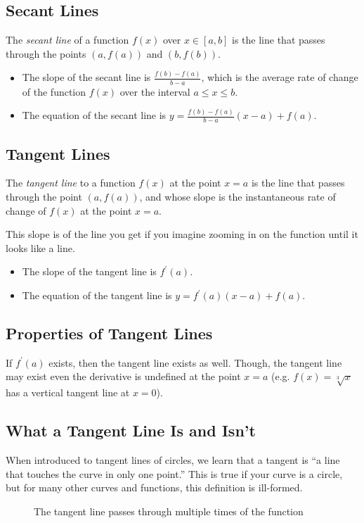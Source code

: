 \subsection{Secant Lines}
The \textit{secant line} of a function $f(x)$ over $x\in\left[a,b\right]$ is the line that passes through the points $(a,f(a))$ and $(b,f(b))$.
\begin{itemize}
  \item The slope of the secant line is $\frac{f(b)-f(a)}{b-a}$, which is the average rate of change of the function $f(x)$ over the interval $a\leq x\leq b$.
  \item The equation of the secant line is $y=\frac{f(b)-f(a)}{b-a}(x-a)+f(a)$.
\end{itemize}

\subsection{Tangent Lines}
The \textit{tangent line} to a function $f(x)$ at the point $x=a$ is the line that passes through the point $(a,f(a))$, and whose slope is the instantaneous rate of change of $f(x)$ at the point $x=a$.
\begin{remark}
This slope is of the line you get if you imagine zooming in on the function until it looks like a line.
\end{remark}
\begin{itemize}
  \item The slope of the tangent line is $f^\prime(a)$.
  \item The equation of the tangent line is $y=f^\prime(a)(x-a)+f(a)$.
\end{itemize}

\subsection{Properties of Tangent Lines}
If $f^\prime(a)$ exists, then the tangent line exists as well. Though, the tangent line may exist even the derivative is undefined at the point $x=a$ (e.g. $f(x)=\sqrt[3]x$ has a vertical tangent line at $x=0$).

\subsection{What a Tangent Line Is and Isn't}
When introduced to tangent lines of circles, we learn that a tangent is ``a line that touches the curve in only one point.'' This is true if your curve is a circle, but for many other curves and functions, this definition is ill-formed.
\begin{figure}[H]
  \centering
  \caption{The tangent line passes through multiple times of the function}
\end{figure}


